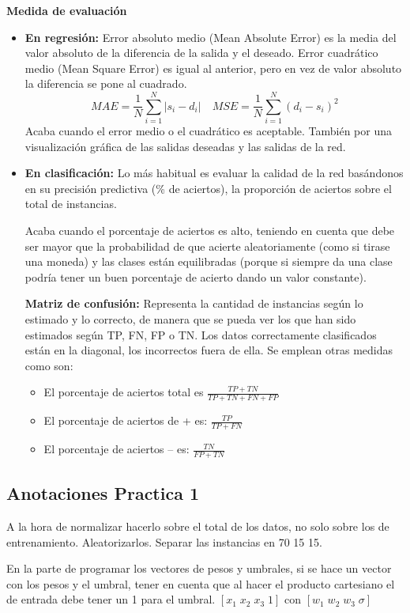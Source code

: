 \documentclass[12pt, twoside, openright]{report} %
\begin{document}
\textbf{Medida de evaluación}
\begin{itemize}
	\item \textbf{En regresión:} Error absoluto medio (Mean Absolute Error) es la media del valor absoluto de la diferencia de la salida y el deseado. Error cuadrático medio (Mean Square Error) es igual al anterior, pero en vez de valor absoluto la diferencia se pone al cuadrado.
	      $$MAE=\frac 1 N \sum^N_{i=1} |s_i-d_i| \quad MSE=\frac 1 N \sum^N_{i=1} (d_i-s_i)^2$$
	      Acaba cuando el error medio o el cuadrático es aceptable. También por una visualización gráfica de las salidas deseadas y las salidas de la red.
	\item \textbf{En clasificación:} Lo más habitual es evaluar la calidad de la red basándonos en su precisión predictiva (\% de aciertos), la proporción de aciertos sobre el total de instancias.
	      
	      Acaba cuando el porcentaje de aciertos es alto, teniendo en cuenta que debe ser mayor que la probabilidad de que acierte aleatoriamente (como si tirase una moneda) y las clases están equilibradas (porque si siempre da una clase podría tener un buen porcentaje de acierto dando un valor constante).
	      
	      \textbf{Matriz de confusión:} Representa la cantidad de instancias según lo estimado y lo correcto, de manera que se pueda ver los que han sido estimados según TP, FN, FP o TN. Los datos correctamente clasificados están en la diagonal, los incorrectos fuera de ella. Se emplean otras medidas como son:
	      \begin{itemize}
		      \item El porcentaje de aciertos total es $\frac {TP+TN} {TP+TN+FN+FP}$
		      \item El porcentaje de aciertos de + es: $\frac {TP} {TP+FN}$
		      \item El porcentaje de aciertos – es: $\frac {TN} {FP+TN}$
	      \end{itemize}
	      
\end{itemize}

\subsection{Anotaciones Practica 1}
A la hora de normalizar hacerlo sobre el total de los datos, no solo sobre los de entrenamiento.
Aleatorizarlos.
Separar las instancias en 70 15 15.

En la parte de programar los vectores de pesos y umbrales, si se hace un vector con los pesos y el umbral, tener en cuenta que al hacer el producto cartesiano el de entrada debe tener un 1 para el umbral. $[x_1 \; x_2 \; x_3 \; 1]$ con $[w_1 \; w_2 \; w_3 \; \sigma]$
\end{document}
